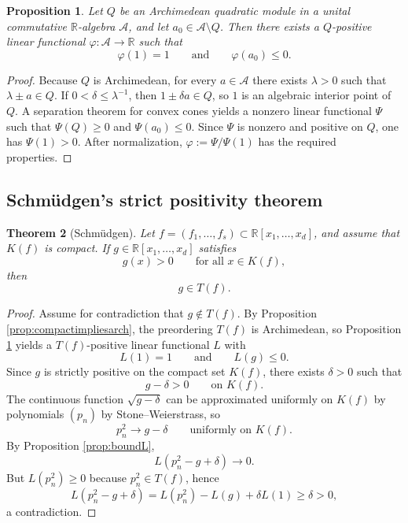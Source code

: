 \documentclass[11pt]{amsart}
\numberwithin{equation}{section}
\newtheorem{theorem}{Theorem}[section]
\newtheorem{proposition}[theorem]{Proposition}
\theoremstyle{definition}
\theoremstyle{remark}
\newcommand{\R}{\mathbb{R}}
\newcommand{\Acal}{\mathcal{A}}
\newcommand{\Rxd}{\R[x_1,\dots,x_d]}
\newcommand{\1}{\mathbf{1}}
\begin{document}
\begin{proposition}\label{prop:separation}
Let \(Q\) be an Archimedean quadratic module in a unital commutative \(\R\)-algebra \(\Acal\), and let \(a_0\in \Acal\setminus Q\). Then there exists a \(Q\)-positive linear functional \(\varphi:\Acal\to\R\) such that
\[
\varphi(1)=1 \qquad\text{and}\qquad \varphi(a_0)\le 0.
\]
\end{proposition}

\begin{proof}
Because \(Q\) is Archimedean, for every \(a\in\Acal\) there exists \(\lambda>0\) such that \(\lambda\pm a\in Q\). If \(0<\delta\le \lambda^{-1}\), then \(1\pm \delta a\in Q\), so \(1\) is an algebraic interior point of \(Q\). A separation theorem for convex cones yields a nonzero linear functional \(\Psi\) such that \(\Psi(Q)\ge 0\) and \(\Psi(a_0)\le 0\). Since \(\Psi\) is nonzero and positive on \(Q\), one has \(\Psi(1)>0\). After normalization, \(\varphi:=\Psi/\Psi(1)\) has the required properties.
\end{proof}

\subsection{Schm\"udgen's strict positivity theorem}

\begin{theorem}[Schm\"udgen]\label{thm:schmudgenpositive}
Let \(f=(f_1,\dots,f_s)\subset\Rxd\), and assume that \(K(f)\) is compact. If \(g\in\Rxd\) satisfies
\[
g(x)>0 \qquad \text{for all }x\in K(f),
\]
then
\[
g\in T(f).
\]
\end{theorem}

\begin{proof}
Assume for contradiction that \(g\notin T(f)\). By Proposition \ref{prop:compactimpliesarch}, the preordering \(T(f)\) is Archimedean, so Proposition \ref{prop:separation} yields a \(T(f)\)-positive linear functional \(L\) with
\[
L(1)=1 \qquad\text{and}\qquad L(g)\le 0.
\]
Since \(g\) is strictly positive on the compact set \(K(f)\), there exists \(\delta>0\) such that
\[
g-\delta>0 \qquad \text{on }K(f).
\]
The continuous function \(\sqrt{g-\delta}\) can be approximated uniformly on \(K(f)\) by polynomials \((p_n)\) by Stone--Weierstrass, so
\[
p_n^2\to g-\delta \qquad \text{uniformly on }K(f).
\]
By Proposition \ref{prop:boundL},
\[
L(p_n^2-g+\delta)\to 0.
\]
But \(L(p_n^2)\ge 0\) because \(p_n^2\in T(f)\), hence
\[
L(p_n^2-g+\delta)=L(p_n^2)-L(g)+\delta L(1)\ge \delta>0,
\]
a contradiction.
\end{proof}
\end{document}
